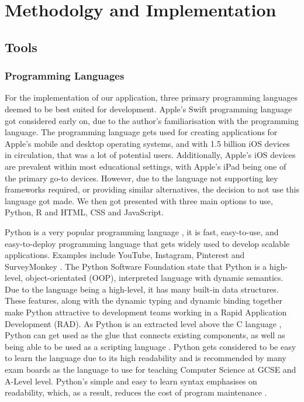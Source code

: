 \chapter{Methodolgy and Implementation}
	\label{chap:implementation}
	
	\section{Tools}
	
	\subsection{Programming Languages}
	
	For the implementation of our application, three primary programming languages deemed to be best suited for development. Apple's Swift programming language \cite{swift} got considered early on, due to the author's familiarisation with the programming language. The programming language gets used for creating applications for Apple's mobile and desktop operating systems, and with 1.5 billion \cite{9to5mac} iOS devices in circulation, that was a lot of potential users. Additionally, Apple's iOS devices are prevalent within most educational settings, with Apple's iPad being one of the primary go-to devices. However, due to the language not supporting key frameworks required, or providing similar alternatives, the decision to not use this language got made. We then got presented with three main options to use, Python, R and HTML, CSS and JavaScript.
	
	Python is a very popular programming language \cite{wired_python, sof_dev_servay20}, it is fast, easy-to-use, and easy-to-deploy programming language that gets widely used to develop scalable applications. Examples include YouTube, Instagram, Pinterest and SurveyMonkey \cite{hackr.io}. The Python Software Foundation state that Python is a high-level, object-orientated (OOP), interpreted language with dynamic semantics. Due to the language being a high-level, it has many built-in data structures. These features, along with the dynamic typing and dynamic binding together make Python attractive to development teams working in a Rapid Application Development (RAD). As Python is an extracted level above the C language \cite{sto_cpython}, Python can get used as the glue that connects existing components, as well as being able to be used as a scripting language \cite{python_desc}. Python gets considered to be easy to learn the language due to its high readability and is recommended by many exam boards as the language to use for teaching Computer Science at GCSE and A-Level level. Python's simple and easy to learn syntax emphasises on readability, which, as a result, reduces the cost of program maintenance \cite{python_desc, pyqt_rbc}. 
	
